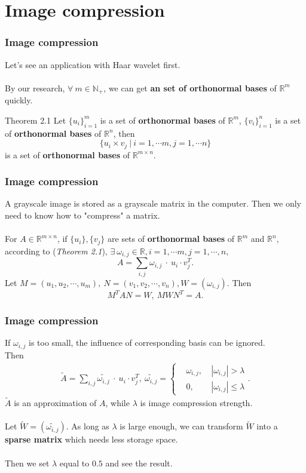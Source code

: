 \documentclass{beamer}
\begin{document}
\section{Image compression}
\begin{frame}
    \frametitle{Image compression}
    Let's see an application with Haar wavelet first.\\ \ \\
    By our research, $\forall\ m \in \mathbb{N}_{+}$, we can get \textbf{an set of orthonormal bases} of $\mathbb{R}^{m}$ quickly.
    \begin{block}{Theorem 2.1}
        Let $\{u_{i}\}_{i=1}^{m}$ is a set of \textbf{orthonormal bases} of $\mathbb{R}^{m}$, $\{v_{i}\}_{i=1}^{n}$ is a set of \textbf{orthonormal bases} of $\mathbb{R}^{n}$, then
        $$\{u_{i}\times v_{j}\ |\ i = 1,\cdots m, j=1,\cdots n\}$$
        is a set of \textbf{orthonormal bases} of $\mathbb{R}^{m\times n}$.
    \end{block}
\end{frame}
\begin{frame}
    \frametitle{Image compression}
    A grayscale image is stored as a grayscale matrix in the computer. Then we only need to know how to "{\color{blue}compress}" a matrix.\\ \ \\
    For $A \in \mathbb{R}^{m\times n}$, if $\{u_{i}\},\{v_{j}\}$ are sets of \textbf{orthonormal bases} of $\mathbb{R}^{m}$ and $\mathbb{R}^{n}$, according to (\textit{Theorem 2.1}),
    $\exists\ \omega_{i,j}\in\mathbb{R}, i = 1, \cdots m, j = 1, \cdots, n,$
    $$	A = \sum_{i,j}\omega_{i,j}\ \cdot \ u_{i} \cdot v_{j}^{T}.$$
    Let $M = (u_{1},u_{2},\cdots,u_{m}),\ N = (v_{1},v_{2},\cdots,v_{n}), W = (\omega_{i,j}).$ Then
    $$M^{T}AN =W,\ MWN^{T} = A.$$
\end{frame}
\begin{frame}
    \frametitle{Image compression}
    {\color{red}If $\omega_{i,j}$ is too small, the influence of  corresponding basis can be ignored.} \\Then
    \begin{align*}
        \widetilde{A} = \sum_{i,j}\widetilde{\omega_{i,j}}\ \cdot \ u_{i} \cdot v_{j}^{T},\ \widetilde{\omega_{i,j}} = \left\{
        \begin{aligned}
             & \omega_{i,j}, & \ |\omega_{i,j}| > \lambda    \\
             & 0,            & \ |\omega_{i,j}| \leq \lambda
        \end{aligned}
        \right..
    \end{align*}
    $\widetilde{A}$ is an approximation of $A$, while $\lambda$ is image compression strength.\\ \ \\
    Let $\widetilde{W} = (\widetilde{\omega_{i,j}}).$ As long as $\lambda$ is large enough, we can transform $\widetilde{W}$ into a \textbf{sparse matrix} which needs less storage space.\\ \ \\
    {\color{blue}Then we set $\lambda$ equal to $0.5$ and see the result.}
\end{frame}
\end{document}
